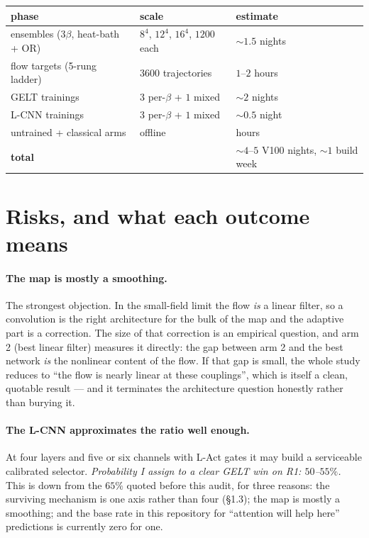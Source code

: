 \documentclass[11pt,a4paper]{article}
\begin{document}
\begin{center}
\begin{tabular}{lll}
\toprule
phase & scale & estimate \\
\midrule
ensembles ($3\beta$, heat-bath + OR) & $8^4$, $12^4$, $16^4$, $1200$ each & $\sim 1.5$ nights \\
flow targets (5-rung ladder) & $3600$ trajectories & $1$--$2$ hours \\
GELT trainings & $3$ per-$\beta$ + $1$ mixed & $\sim 2$ nights \\
L-CNN trainings & $3$ per-$\beta$ + $1$ mixed & $\sim 0.5$ night \\
untrained + classical arms & offline & hours \\
\midrule
\multicolumn{2}{l}{\textbf{total}} & $\sim 4$--$5$ V100 nights, $\sim 1$ build week \\
\bottomrule
\end{tabular}
\end{center}

\section{Risks, and what each outcome means}
\label{sec:risks}

\paragraph{The map is mostly a smoothing.} The strongest objection. In the
small-field limit the flow \emph{is} a linear filter, so a convolution is the
right architecture for the bulk of the map and the adaptive part is a correction.
The size of that correction is an empirical question, and arm 2 (best linear
filter) measures it directly: the gap between arm 2 and the best network
\emph{is} the nonlinear content of the flow. If that gap is small, the whole
study reduces to ``the flow is nearly linear at these couplings'', which is
itself a clean, quotable result --- and it terminates the architecture question
honestly rather than burying it.

\paragraph{The L-CNN approximates the ratio well enough.} At four layers and
five or six channels with L-Act gates it may build a serviceable calibrated
selector. \emph{Probability I assign to a clear GELT win on R1: $50$--$55\%$.}
This is down from the $65\%$ quoted before this audit, for three reasons: the
surviving mechanism is one axis rather than four (\S1.3); the map is mostly a
smoothing; and the base rate in this repository for ``attention will help here''
predictions is currently zero for one.
\end{document}
